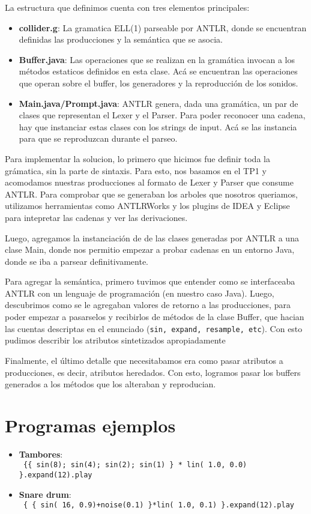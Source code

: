 \documentclass[a4paper]{article}
\begin{document}
La estructura que definimos cuenta con tres elementos principales:
\begin{itemize}
    \item \textbf{collider.g}: La gramatica ELL(1) parseable por ANTLR,
        donde se encuentran definidas las producciones y la sem\'antica
        que se asocia.
    \item \textbf{Buffer.java}: Las operaciones que se realizan en la 
        gram\'atica invocan a los m\'etodos estaticos definidos en esta
        clase. Ac\'a se encuentran las operaciones que operan sobre el 
        buffer, los generadores y la reproducci\'on de los sonidos.
    \item \textbf{Main.java/Prompt.java}: ANTLR genera, dada una gram\'atica, un
        par de clases que representan el Lexer y el Parser. Para
        poder reconocer una cadena, hay que instanciar estas clases
        con los strings de input. Ac\'a se las instancia para que se 
        reproduzcan durante el parseo.
\end{itemize}

Para implementar la solucion, lo primero que hicimos fue definir toda la
gr\'amatica, sin la parte de sintaxis. Para esto, nos basamos en el TP1 y
acomodamos nuestras producciones al formato de Lexer y Parser que consume ANTLR.
Para comprobar que se generaban los arboles que nosotros queriamos, utilizamos
herramientas como ANTLRWorks y los plugins de IDEA y Eclipse para intepretar 
las cadenas y ver las derivaciones. 

Luego, agregamos la instanciaci\'on de de las clases generadas por ANTLR
a una clase Main, donde nos permitio empezar a probar cadenas en un 
entorno Java, donde se iba a parsear definitivamente.

Para agregar la sem\'antica, primero tuvimos que entender como se interfaceaba
ANTLR con un lenguaje de programaci\'on (en nuestro caso Java). Luego, descubrimos
como se le agregaban valores de retorno a las producciones, para poder empezar
a pasarselos y recibirlos de m\'etodos de la clase Buffer, que hacian las cuentas
descriptas en el enunciado (\texttt{sin, expand, resample, etc}). Con esto
pudimos describir los atributos sintetizados apropiadamente

Finalmente, el \'ultimo detalle que necesitabamos era como pasar atributos a
producciones, es decir, atributos heredados. Con esto, logramos pasar
los buffers generados a los m\'etodos que los alteraban y reproducian.

\section{Programas ejemplos}
\begin{itemize}
    \item \textbf{Tambores}:\\
        \hbox{\texttt{ \{\{ sin(8); sin(4); sin(2); sin(1) \} * lin( 1.0, 0.0) \}.expand(12).play }}
    \item \textbf{Snare drum}:\\
        \hbox{\texttt{ \{ \{ sin( 16, 0.9)+noise(0.1) \}*lin( 1.0, 0.1) \}.expand(12).play  }}
\end{itemize}
\end{document}
